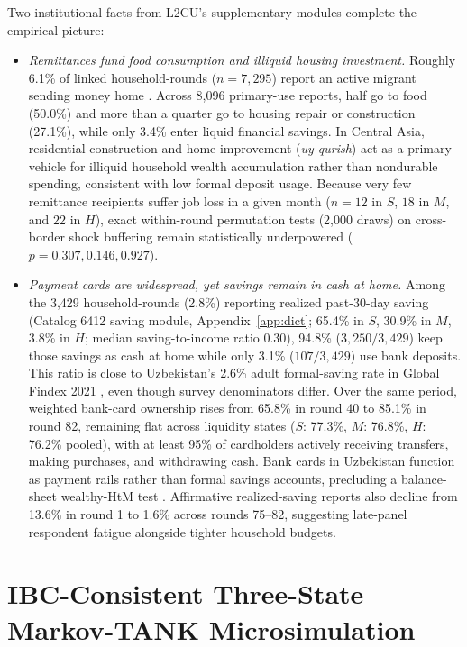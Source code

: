 \documentclass[11pt]{article}
\begin{document}
Two institutional facts from L2CU's supplementary modules complete the empirical picture:
\begin{itemize}
\item \textit{Remittances fund food consumption and illiquid housing investment.} Roughly 6.1\% of linked household-rounds ($n = 7{,}295$) report an active migrant sending money home \citep{kakhkharov2017transaction,seitz2019migration,abduvaliev2020impact,kakhkharov2021south}. Across 8,096 primary-use reports, half go to food (50.0\%) and more than a quarter go to housing repair or construction (27.1\%), while only 3.4\% enter liquid financial savings. In Central Asia, residential construction and home improvement (\textit{uy qurish}) act as a primary vehicle for illiquid household wealth accumulation rather than nondurable spending, consistent with low formal deposit usage. Because very few remittance recipients suffer job loss in a given month ($n = 12$ in $S$, $18$ in $M$, and $22$ in $H$), exact within-round permutation tests (2,000 draws) on cross-border shock buffering remain statistically underpowered ($p = 0.307, 0.146, 0.927$).
\item \textit{Payment cards are widespread, yet savings remain in cash at home.} Among the 3,429 household-rounds (2.8\%) reporting realized past-30-day saving (Catalog 6412 saving module, Appendix~\ref{app:dict}; 65.4\% in $S$, 30.9\% in $M$, 3.8\% in $H$; median saving-to-income ratio 0.30), 94.8\% ($3{,}250/3{,}429$) keep those savings as cash at home while only 3.1\% ($107/3{,}429$) use bank deposits. This ratio is close to Uzbekistan's 2.6\% adult formal-saving rate in Global Findex 2021 \citep{demirguckunt2022findex}, even though survey denominators differ. Over the same period, weighted bank-card ownership rises from 65.8\% in round 40 to 85.1\% in round 82, remaining flat across liquidity states ($S$: 77.3\%, $M$: 76.8\%, $H$: 76.2\% pooled), with at least 95\% of cardholders actively receiving transfers, making purchases, and withdrawing cash. Bank cards in Uzbekistan function as payment rails rather than formal savings accounts, precluding a balance-sheet wealthy-HtM test \citep{kaplan2014wealthy}. Affirmative realized-saving reports also decline from 13.6\% in round 1 to 1.6\% across rounds 75--82, suggesting late-panel respondent fatigue alongside tighter household budgets.
\end{itemize}

\section{IBC-Consistent Three-State Markov-TANK Microsimulation}\label{sec:model}
\end{document}
